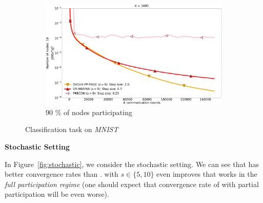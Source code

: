 \documentclass[10pt]{article}
\begin{document}
\begin{figure}[H]
\begin{subfigure}{.33\textwidth}
        \includegraphics[width=\textwidth]{neurips_2022_finite_sum_mnist_nof_1000_numnodes_10_more_probs_batch_size_100_split_by_labels_logistic_frecon_number_of_workers_9.pdf}
        \caption{90 \% of nodes participating}
    \end{subfigure}
    \caption{Classification task on \textit{MNIST}}
\label{fig:finite-sum-mnist}
\end{figure}



\begin{center}
    \bf Stochastic Setting
\end{center}

In Figure~\ref{fig:stochastic}, we consider the stochastic setting. We can see that  has better convergence rates than .  with $s \in \{5, 10\}$ even improves  that works in the \emph{full participation regime} (one should expect that convergence rate of  with partial participation will be even worse).
\end{document}
